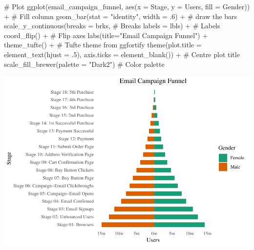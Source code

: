\documentclass[a4paper]{article}
\newenvironment{Shaded}{}{}
\newcommand{\KeywordTok}[1]{\textcolor[rgb]{0.00,0.00,1.00}{#1}}
\newcommand{\DataTypeTok}[1]{#1}
\newcommand{\DecValTok}[1]{#1}
\newcommand{\StringTok}[1]{\textcolor[rgb]{0.00,0.50,0.50}{#1}}
\newcommand{\CommentTok}[1]{\textcolor[rgb]{0.00,0.50,0.00}{#1}}
\newcommand{\OperatorTok}[1]{#1}
\newcommand{\NormalTok}[1]{#1}
\begin{document}
\begin{Shaded}
\begin{Highlighting}[]
\CommentTok{# Plot}
\KeywordTok{ggplot}\NormalTok{(email_campaign_funnel, }\KeywordTok{aes}\NormalTok{(}\DataTypeTok{x =}\NormalTok{ Stage, }\DataTypeTok{y =}\NormalTok{ Users, }\DataTypeTok{fill =}\NormalTok{ Gender)) }\OperatorTok{+}\StringTok{   }\CommentTok{# Fill column}
\StringTok{                              }\KeywordTok{geom_bar}\NormalTok{(}\DataTypeTok{stat =} \StringTok{"identity"}\NormalTok{, }\DataTypeTok{width =}\NormalTok{ .}\DecValTok{6}\NormalTok{) }\OperatorTok{+}\StringTok{   }\CommentTok{# draw the bars}
\StringTok{                              }\KeywordTok{scale_y_continuous}\NormalTok{(}\DataTypeTok{breaks =}\NormalTok{ brks,   }\CommentTok{# Breaks}
                                                 \DataTypeTok{labels =}\NormalTok{ lbls) }\OperatorTok{+}\StringTok{ }\CommentTok{# Labels}
\StringTok{                              }\KeywordTok{coord_flip}\NormalTok{() }\OperatorTok{+}\StringTok{  }\CommentTok{# Flip axes}
\StringTok{                              }\KeywordTok{labs}\NormalTok{(}\DataTypeTok{title=}\StringTok{"Email Campaign Funnel"}\NormalTok{) }\OperatorTok{+}
\StringTok{                              }\KeywordTok{theme_tufte}\NormalTok{() }\OperatorTok{+}\StringTok{  }\CommentTok{# Tufte theme from ggfortify}
\StringTok{                              }\KeywordTok{theme}\NormalTok{(}\DataTypeTok{plot.title =} \KeywordTok{element_text}\NormalTok{(}\DataTypeTok{hjust =}\NormalTok{ .}\DecValTok{5}\NormalTok{), }
                                    \DataTypeTok{axis.ticks =} \KeywordTok{element_blank}\NormalTok{()) }\OperatorTok{+}\StringTok{   }\CommentTok{# Centre plot title}
\StringTok{                              }\KeywordTok{scale_fill_brewer}\NormalTok{(}\DataTypeTok{palette =} \StringTok{"Dark2"}\NormalTok{)  }\CommentTok{# Color palette}
\end{Highlighting}
\end{Shaded}

\includegraphics{M24-ggplot2_Gallery_files/figure-latex/unnamed-chunk-31-1.pdf}
\end{document}
